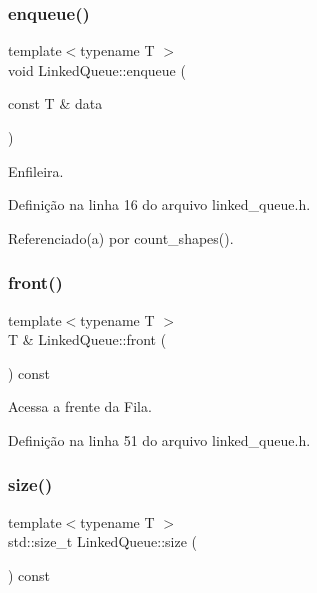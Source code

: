 \subsubsection{\texorpdfstring{enqueue()}{enqueue()}}
{\footnotesize\ttfamily template$<$typename T $>$ \\
void Linked\+Queue\+::enqueue (\begin{DoxyParamCaption}\item[{const T \&}]{data }\end{DoxyParamCaption})}



Enfileira. 



Definição na linha 16 do arquivo linked\+\_\+queue.\+h.



Referenciado(a) por count\+\_\+shapes().

\mbox{\label{classstructures_1_1_linked_queue_aa6d2f0263b390193d2aae72499aa00b4}} 
\subsubsection{\texorpdfstring{front()}{front()}}
{\footnotesize\ttfamily template$<$typename T $>$ \\
T \& Linked\+Queue\+::front (\begin{DoxyParamCaption}{ }\end{DoxyParamCaption}) const}



Acessa a frente da Fila. 



Definição na linha 51 do arquivo linked\+\_\+queue.\+h.

\mbox{\label{classstructures_1_1_linked_queue_a97af1a092fe5f7f15182bf93d1bc396d}} 
\subsubsection{\texorpdfstring{size()}{size()}}
{\footnotesize\ttfamily template$<$typename T $>$ \\
std\+::size\+\_\+t Linked\+Queue\+::size (\begin{DoxyParamCaption}{ }\end{DoxyParamCaption}) const}



